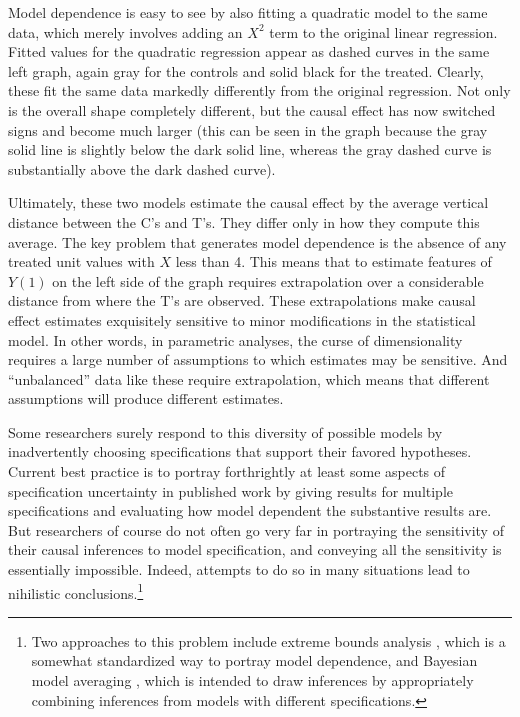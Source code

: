 \documentclass[11pt,titlepage]{article}
\begin{document}
Model dependence is easy to see by also fitting a quadratic model to
the same data, which merely involves adding an $X^2$ term to the
original linear regression.  Fitted values for the quadratic
regression appear as dashed curves in the same left graph, again gray
for the controls and solid black for the treated.  Clearly, these fit
the same data markedly differently from the original regression.  Not
only is the overall shape completely different, but the causal effect
has now switched signs and become much larger (this can be seen in the
graph because the gray solid line is slightly below the dark solid
line, whereas the gray dashed curve is substantially above the dark
dashed curve).

Ultimately, these two models estimate the causal effect by the average
vertical distance between the C's and T's.  They differ only in how
they compute this average.  The key problem that generates model
dependence is the absence of any treated unit values with $X$ less
than 4.  This means that to estimate features of $Y(1)$ on the left
side of the graph requires extrapolation over a considerable distance
from where the T's are observed.  These extrapolations make causal
effect estimates exquisitely sensitive to minor modifications in the
statistical model.  In other words, in parametric analyses, the curse
of dimensionality requires a large number of assumptions to which
estimates may be sensitive.  And ``unbalanced'' data like these
require extrapolation, which means that different assumptions will
produce different estimates.

Some researchers surely respond to this diversity of possible models
by inadvertently choosing specifications that support their favored
hypotheses.  Current best practice is to portray forthrightly at least
some aspects of specification uncertainty in published work by giving
results for multiple specifications and evaluating how model dependent
the substantive results are.  But researchers of course do not often
go very far in portraying the sensitivity of their causal inferences
to model specification, and conveying all the sensitivity is
essentially impossible.  Indeed, attempts to do so in many situations
lead to nihilistic conclusions.\footnote{Two approaches to this
  problem include extreme bounds analysis \citep{Leamer78}, which is a
  somewhat standardized way to portray model dependence, and Bayesian
  model averaging \citep{HoeMadRaf99,ImaKin04}, which is intended to
  draw inferences by appropriately combining inferences from models
  with different specifications.}
\end{document}
